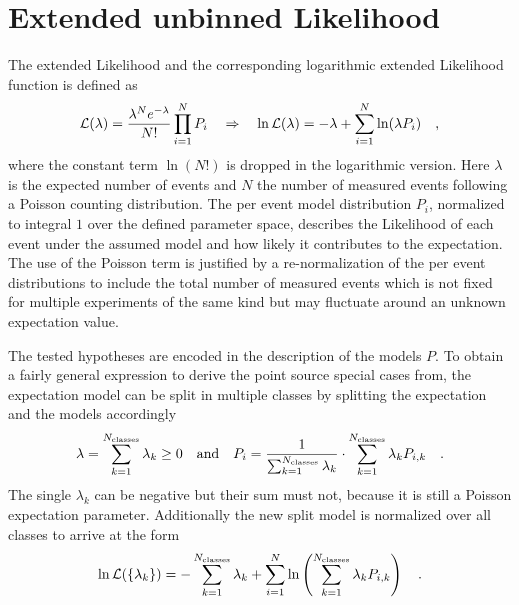 \section{Extended unbinned Likelihood}
The extended Likelihood  and the corresponding logarithmic extended Likelihood function is defined as
\begin{equation}
  \mathcal{L}(\lambda) = \frac{\lambda^N e^{-\lambda}}{N!}\prod_{i=1}^N P_i
  \quad\Rightarrow\quad
    \ln\mathcal{L}(\lambda) = -\lambda+\sum_{i=1}^N \ln(\lambda P_i)
  \quad\text{,}
\end{equation}
where the constant term $\ln(N!)$ is dropped in the logarithmic version.
Here $\lambda$ is the expected number of events and $N$ the number of measured events following a Poisson counting distribution.
The per event model distribution $P_i$, normalized to integral $1$ over the defined parameter space, describes the Likelihood of each event under the assumed model and how likely it contributes to the expectation.
The use of the Poisson term is justified by a re-normalization of the per event distributions to include the total number of measured events which is not fixed for multiple experiments of the same kind but may fluctuate around an unknown expectation value.

The tested hypotheses are encoded in the description of the models $P$.
To obtain a fairly general expression to derive the point source special cases from, the expectation model can be split in multiple classes by splitting the expectation and the models accordingly
\begin{equation}
  \lambda = \sum_{k=1}^{N_\text{classes}} \lambda_k \geq 0
  \quad\text{and}\quad
  P_i = \frac{1}{\sum_{k=1}^{N_\text{classes}} \lambda_k}\cdot
         \sum_{k=1}^{N_\text{classes}} \lambda_k P_{i,k}
  \quad\text{.}
\end{equation}
The single $\lambda_k$ can be negative but their sum must not, because it is still a Poisson expectation parameter.
Additionally the new split model is normalized over all classes to arrive at the form
\begin{equation}
  \ln\mathcal{L}(\{\lambda_k\})
  = -\sum_{k=1}^{N_\text{classes}} \lambda_k +
    \sum_{i=1}^N \ln\left(\sum_{k=1}^{N_\text{classes}}
      \lambda_k P_{i,k} \right)
  \quad\text{.}
\end{equation}

